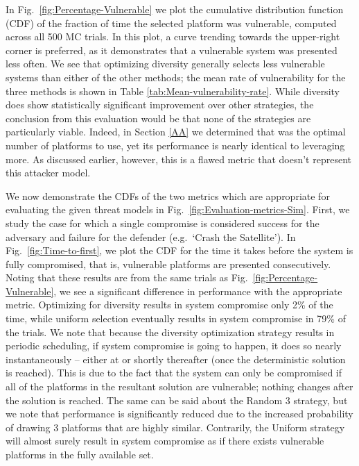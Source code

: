\documentclass{acm_proc_article-sp}
\begin{document}
In Fig.\ \ref{fig:Percentage-Vulnerable} we plot the cumulative distribution function (CDF) of the fraction of time the selected platform was vulnerable, computed across all 500 MC trials. In this plot, a curve trending towards the upper-right corner is preferred, as it demonstrates that a vulnerable system was presented less often. We see that optimizing diversity generally selects less vulnerable systems than either of the other methods; the mean rate of vulnerability for the three methods is shown in Table \ref{tab:Mean-vulnerability-rate}. While diversity does show statistically significant improvement over other strategies, the conclusion from this evaluation would be that none of the strategies are particularly viable. Indeed, in Section \ref{AA} we determined that  was the optimal number of platforms to use, yet its performance is nearly identical to leveraging more. As discussed earlier, however, this is a flawed metric that doesn't represent this attacker model.

We now demonstrate the CDFs of the two metrics which are appropriate for evaluating the given threat models in Fig.\ \ref{fig:Evaluation-metrics-Sim}. First, we study the case for which a single compromise is considered success for the adversary and failure for the defender (e.g.\ `Crash the Satellite'). In Fig.\ \ref{fig:Time-to-first}, we plot the CDF for the time it takes before the system is fully compromised, that is,  vulnerable platforms are presented consecutively. Noting that these results are from the same trials as Fig.\ \ref{fig:Percentage-Vulnerable}, we see a significant difference in performance with the appropriate metric. Optimizing for diversity results in system compromise only 2\% of the time, while uniform selection eventually results in system compromise in 79\% of the trials. We note that because the diversity optimization strategy results in periodic scheduling, if system compromise is going to happen, it does so nearly instantaneously -- either at  or shortly thereafter (once 
the 
deterministic solution is reached). This is due to the fact that the system can only be compromised if all of the platforms in the resultant solution are vulnerable; nothing
changes after the solution is reached. The same can be said about the Random 3 strategy, but we note that performance is significantly reduced due to the increased probability of drawing 3 platforms that are highly similar. Contrarily, the Uniform strategy will almost surely result in system compromise as  if there exists  vulnerable platforms in the fully available set.
\end{document}

